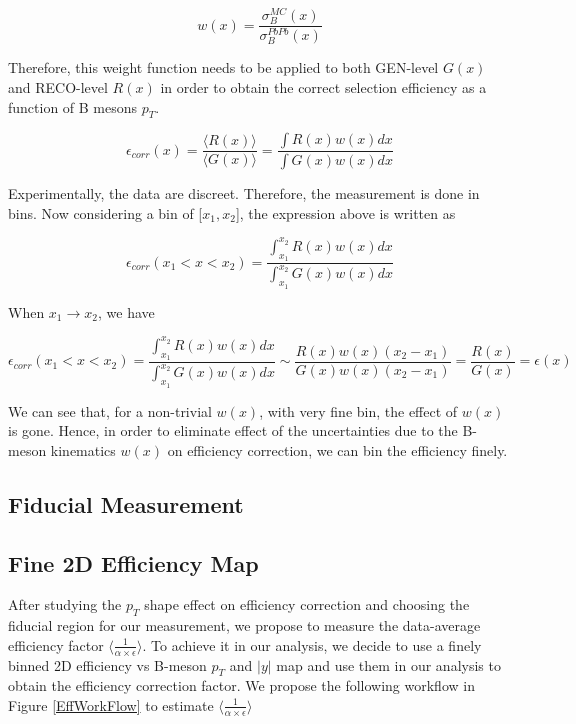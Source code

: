 \begin{equation}
w(x) = \frac{\sigma^{MC}_B (x)}{\sigma^{PbPb}_B (x)}
\end{equation}

Therefore, this weight function needs to be applied to both GEN-level $G(x)$ and RECO-level $R(x)$ in order to obtain the correct selection efficiency as a function of B mesons $p_T$. 


\begin{equation}
\epsilon_{corr}(x) =  \frac{\langle R(x) \rangle}{\langle G(x) \rangle}= \frac{\int R(x) w(x)dx}{\int G(x) w(x)dx}
\end{equation}

Experimentally, the data are discreet. Therefore, the measurement is done in bins. Now considering a bin of [$x_1,x_2$], the expression above is written as 

\begin{equation}
\epsilon_{corr}(x_1 < x < x_2) =  \frac{\int^{x_2}_{x_1} R(x) w(x)dx}{\int^{x_2}_{x_1} G(x) w(x)dx}
\end{equation}


When $x_1 \rightarrow x_2$, we have

\begin{equation}
\epsilon_{corr}(x_1 < x < x_2) =  \frac{\int^{x_2}_{x_1} R(x) w(x)dx}{\int^{x_2}_{x_1} G(x) w(x)dx} \sim  \frac{R(x) w(x)  (x_2 - x_1)}{G(x) w(x) (x_2 - x_1)}  = \frac{R(x)}{G(x)} = \epsilon(x)
\end{equation}

We can see that, for a non-trivial $w(x)$, with very fine bin, the effect of $w(x)$ is gone. Hence, in order to eliminate effect of the uncertainties due to the B-meson kinematics $w(x)$ on efficiency correction, we can bin the efficiency finely.

\subsection{Fiducial Measurement}



\subsection{Fine 2D Efficiency Map}

After studying the $p_T$ shape effect on efficiency correction and choosing the fiducial region for our measurement, we propose to measure the data-average efficiency factor $\langle\frac{1}{\alpha \times \epsilon} \rangle$. To achieve it in our analysis, we decide to use a finely binned 2D efficiency vs B-meson $p_T$ and $|y|$ map and use them in our analysis to obtain the efficiency correction factor. We propose the following workflow in Figure \ref{EffWorkFlow} to estimate $\langle\frac{1}{\alpha \times \epsilon} \rangle$


